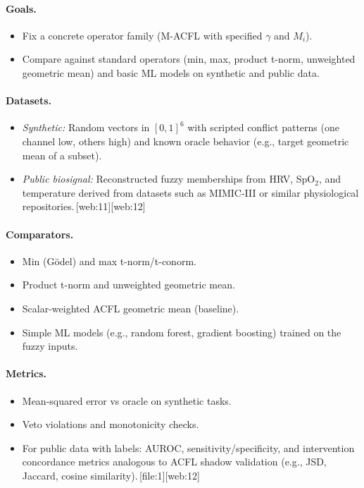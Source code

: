 \documentclass[11pt]{article}
\begin{document}
\paragraph{Goals.}
\begin{itemize}
  \item Fix a concrete operator family (M-ACFL with specified $\gamma$ and $M_i$).
  \item Compare against standard operators (min, max, product t-norm, unweighted geometric mean) and basic ML models on synthetic and public data.
\end{itemize}

\paragraph{Datasets.}
\begin{itemize}
  \item \emph{Synthetic:} Random vectors in $[0,1]^6$ with scripted conflict patterns (one channel low, others high) and known oracle behavior (e.g., target geometric mean of a subset).
  \item \emph{Public biosignal:} Reconstructed fuzzy memberships from HRV, SpO$_2$, and temperature derived from datasets such as MIMIC-III or similar physiological repositories.\,[web:11][web:12]
\end{itemize}

\paragraph{Comparators.}
\begin{itemize}
  \item Min (G\"odel) and max t-norm/t-conorm.
  \item Product t-norm and unweighted geometric mean.
  \item Scalar-weighted ACFL geometric mean (baseline).
  \item Simple ML models (e.g., random forest, gradient boosting) trained on the fuzzy inputs.
\end{itemize}

\paragraph{Metrics.}
\begin{itemize}
  \item Mean-squared error vs oracle on synthetic tasks.
  \item Veto violations and monotonicity checks.
  \item For public data with labels: AUROC, sensitivity/specificity, and intervention concordance metrics analogous to ACFL shadow validation (e.g., JSD, Jaccard, cosine similarity).\,[file:1][web:12]
\end{itemize}
\end{document}
